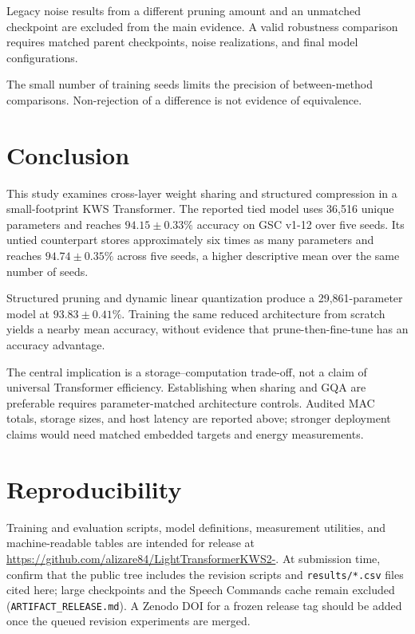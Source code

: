 \documentclass[journal]{IEEEtran}
\begin{document}
Legacy noise results from a different pruning amount and an
unmatched checkpoint are excluded from the main evidence.
A valid robustness comparison requires matched parent checkpoints,
noise realizations, and final model configurations.

The small number of training seeds limits the precision of
between-method comparisons.
Non-rejection of a difference is not evidence of equivalence.

\section{Conclusion}

This study examines cross-layer weight sharing and structured
compression in a small-footprint KWS Transformer.
The reported tied model uses 36,516 unique parameters and reaches
$94.15\pm0.33\%$ accuracy on GSC v1-12 over five seeds.
Its untied counterpart stores approximately six times as many
parameters and reaches $94.74\pm0.35\%$ across five seeds,
a higher descriptive mean over the same number of seeds.

Structured pruning and dynamic linear quantization produce a
29,861-parameter model at $93.83\pm0.41\%$.
Training the same reduced architecture from scratch yields a
nearby mean accuracy, without evidence that prune-then-fine-tune
has an accuracy advantage.

The central implication is a storage--computation trade-off,
not a claim of universal Transformer efficiency.
Establishing when sharing and GQA are preferable requires
parameter-matched architecture controls.
Audited MAC totals, storage sizes, and host latency are reported
above; stronger deployment claims would need matched embedded
targets and energy measurements.

\section*{Reproducibility}

Training and evaluation scripts, model definitions, measurement
utilities, and machine-readable tables are intended for release at
\url{https://github.com/alizare84/LightTransformerKWS2-}.
At submission time, confirm that the public tree includes the
revision scripts and \texttt{results/*.csv} files cited here; large
checkpoints and the Speech Commands cache remain excluded
(\texttt{ARTIFACT\_RELEASE.md}).
A Zenodo DOI for a frozen release tag should be added once the
queued revision experiments are merged.
\end{document}

